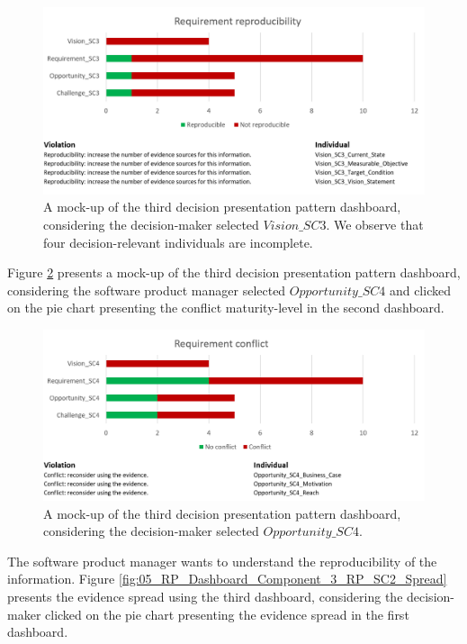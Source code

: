 \begin{figure}[H]
\centering
  \includegraphics[width=16cm]{../../Images/05_Validation/05_RP_Dashboard_Component_3_RP_SC2_Reproducibility.png}
  \caption{A mock-up of the third decision presentation pattern dashboard, considering the decision-maker selected $Vision\_SC3$. We observe that four decision-relevant individuals are incomplete.}
  \label{fig:05_RP_Dashboard_Component_3_RP_SC2_Reproducibility}
\end{figure}

Figure \ref{fig:05_RP_Dashboard_Component_3_RP_SC2_Conflict} presents a mock-up of the third decision presentation pattern dashboard, considering the software product manager selected $Opportunity\_SC4$ and clicked on the pie chart presenting the conflict maturity-level in the second dashboard.

\begin{figure}[H]
\centering
  \includegraphics[width=16cm]{../../Images/05_Validation/05_RP_Dashboard_Component_3_RP_SC2_Conflict.png}
  \caption{A mock-up of the third decision presentation pattern dashboard, considering the decision-maker selected $Opportunity\_SC4$.}
  \label{fig:05_RP_Dashboard_Component_3_RP_SC2_Conflict}
\end{figure}

The software product manager wants to understand the reproducibility of the information. Figure \ref{fig:05_RP_Dashboard_Component_3_RP_SC2_Spread} presents the evidence spread using the third dashboard, considering the decision-maker clicked on the pie chart presenting the evidence spread in the first dashboard. 

